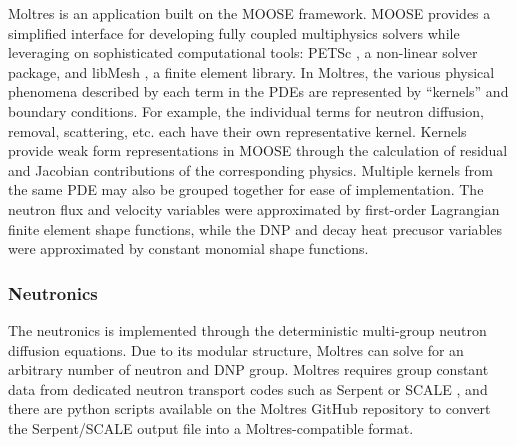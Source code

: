 Moltres is an application built on the MOOSE \cite{gaston_physics-based_2015}
framework. MOOSE provides a simplified interface for developing fully
coupled multiphysics solvers while leveraging on sophisticated computational
tools: PETSc \cite{satish_petsc_2019}, a non-linear solver package, and
libMesh \cite{kirk_libmesh:_2006}, a finite element library. In Moltres, the
various physical phenomena described by each term in the \glspl{PDE} are
represented by ``kernels'' and boundary conditions. For
example, the individual terms for neutron diffusion, removal, scattering, etc.
each have their own representative kernel. Kernels provide weak
form representations in MOOSE through the calculation of residual and Jacobian
contributions of the corresponding physics. Multiple kernels from the same
\gls{PDE} may also be grouped together for ease of implementation. The neutron
flux and velocity variables were approximated by first-order
Lagrangian finite element shape functions, while the \gls{DNP} and decay heat
precusor variables were approximated by constant monomial shape functions.



\subsubsection{Neutronics}

The neutronics is implemented through the deterministic multi-group neutron
diffusion equations. Due to its modular structure, Moltres can solve for an
arbitrary number of neutron and \gls{DNP} group. Moltres requires group
constant data from dedicated neutron transport codes such as Serpent or SCALE
\cite{dehart_reactor_2011}, and there are python scripts available on the
Moltres GitHub repository \cite{lindsay_moltres_2017} to convert the
Serpent/SCALE output file into a Moltres-compatible format.

